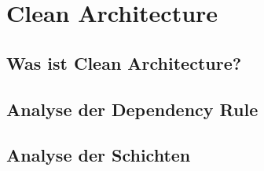 \chapter{Clean Architecture}

\section{Was ist Clean Architecture?}

\section{Analyse der Dependency Rule}

\section{Analyse der Schichten}